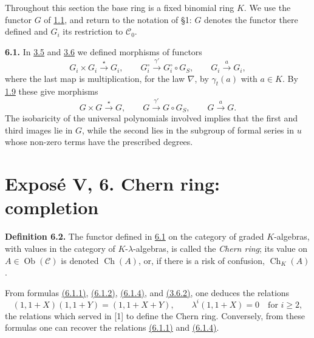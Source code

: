 Throughout this section the base ring is a fixed binomial ring \(K\). We use the functor \(G\) of \hyperlink{sga6.e05.para.1-1}{1.1}, and return to the notation of §1: \(G\) denotes the functor there defined and \(G_i\) its restriction to \(\mathscr C_0\).

\textbf{6.1.} In \hyperlink{sga6.e05.para.3-5}{3.5} and \hyperlink{sga6.e05.para.3-6}{3.6} we defined morphisms of functors
\[
  G_i\times G_i\xrightarrow{\star}G_i,
  \qquad
  G_i^\circ\xrightarrow{\gamma'}G_i^\circ\circ G_S,
  \qquad
  G_i\xrightarrow{a}G_i,
\]
where the last map is multiplication, for the law \(\nabla\), by \(\gamma_t(a)\) with \(a\in K\). By \hyperlink{sga6.e05.lem.1-9}{1.9} these give morphisms
\[
  G\times G\xrightarrow{\star}G,
  \qquad
  G\xrightarrow{\gamma'}G\circ G_S,
  \qquad
  G\xrightarrow{a}G.
\]
The isobaricity of the universal polynomials involved implies that the first and third images lie in \(G\), while the second lies in the subgroup of formal series in \(u\) whose non-zero terms have the prescribed degrees.



\providecommand{\Ghat}{\widehat G}
\providecommand{\Aqhat}{\widehat A_{\mathbb Q}}
\providecommand{\Ch}{\operatorname{Ch}}
\providecommand{\Log}{\operatorname{Log}}
\providecommand{\id}{\operatorname{id}}
\providecommand{\gr}{\operatorname{gr}}
\providecommand{\Hom}{\operatorname{Hom}}
\providecommand{\epsi}{\varepsilon}
\providecommand{\clgr}{\operatorname{cl}}
\providecommand{\Fil}{\operatorname{Fil}}
\providecommand{\Gr}{\operatorname{Gr}}
\providecommand{\Sym}{\operatorname{Sym}}


\section*{Exposé V, 6. Chern ring: completion}

\textbf{Definition 6.2.} The functor defined in \hyperlink{sga6.e05.para.6-1}{6.1} on the category of graded \(K\)-algebras, with values in the category of \(K\)-\(\lambda\)-algebras, is called the \emph{Chern ring}; its value on \(A\in\operatorname{Ob}(\mathscr C)\) is denoted \(\Ch(A)\), or, if there is a risk of confusion, \(\Ch_K(A)\).

From formulas \hyperlink{sga6.e05.para.6-1}{(6.1.1)}, \hyperlink{sga6.e05.para.6-1}{(6.1.2)}, \hyperlink{sga6.e05.para.6-1}{(6.1.4)}, and \hyperlink{sga6.e05.eq.3-6-2}{(3.6.2)}, one deduces the relations
\begin{equation}\tag{6.2.1}
 (1,1+X)(1,1+Y)=(1,1+X+Y),
 \qquad
 \lambda^i(1,1+X)=0\quad\text{for }i\ge2,
\end{equation}
the relations which served in [1] to define the Chern ring. Conversely, from these formulas one can recover the relations \hyperlink{sga6.e05.para.6-1}{(6.1.1)} and \hyperlink{sga6.e05.para.6-1}{(6.1.4)}.

